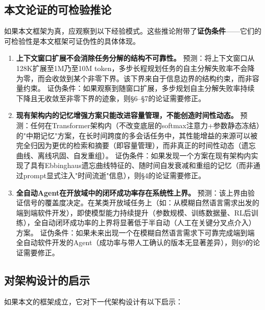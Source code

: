 \documentclass[11pt,a4paper]{ctexart}
\begin{document}
\subsection{本文论证的可检验推论}

如果本文框架为真，应观察到以下经验模式。这些推论附带了\textbf{证伪条件}——它们的可检验性是本文框架可证伪性的具体体现。

\begin{enumerate}[leftmargin=*,label=\textbf{T\arabic*}.]
    \item \textbf{上下文窗口扩展不会消除任务分解的结构不可靠性。}
    预测：将上下文窗口从128K扩展至1M乃至10M token，多步长程规划任务的自主分解失败率不会降为零，而会收敛到某个非零下界。该下界来自于信息边界的结构约束，而非容量约束。
    证伪条件：如果观察到随窗口扩展，多步规划自主分解失败率持续下降且无收敛至非零下界的迹象，则§6--§7的论证需要修正。

    \item \textbf{现有架构内的记忆增强方案只能改进容量管理，不能创造时间性动态。}
    预测：任何在Transformer架构内（不改变底层的softmax注意力+参数静态冻结）的"中期记忆"方案，在长时间跨度的多会话任务中，其性能增益的来源可以被完全归因为更优的检索和摘要（即容量管理），而非真正的时间性动态（遗忘曲线、离线巩固、自发重组）。
    证伪条件：如果发现一个方案在现有架构内实现了具有Ebbinghaus遗忘曲线特征的、随时间自发衰减和重组的记忆（而非通过prompt显式注入"时间流逝"信息），则§4的论证需要修正。

    \item \textbf{全自动Agent在开放域中的闭环成功率存在系统性上界。}
    预测：该上界由验证信号的覆盖度决定。在某类开放域任务上（如：从模糊自然语言需求出发的端到端软件开发），即使模型能力持续提升（参数规模、训练数据量、RL后训练），全自动闭环成功率的上界将显著低于半自动（人工在关键分叉点介入）方案。
    证伪条件：如果未来出现一个在模糊自然语言需求下可靠完成端到端全自动软件开发的Agent（成功率与带人工确认的版本无显著差异），则§9的论证需要修正。
\end{enumerate}

\subsection{对架构设计的启示}

如果本文的框架成立，它对下一代架构设计有以下启示：
\end{document}
